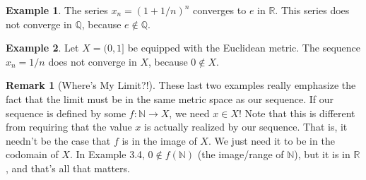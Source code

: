 \documentclass{article}
\newcommand{\N}{\mathbb{N}}
\newcommand{\R}{\mathbb{R}}
\newcommand{\Q}{\mathbb{Q}}
\theoremstyle{definition}
\newtheorem{example}{Example}[section]
\newtheorem{remark}{Remark}[section]
\begin{document}
\begin{example}
	The series $ x_n=(1+1/n)^n $ converges to $ e $ in $ \R $. This series does not converge in $ \Q $, because $ e\notin\Q $. 
\end{example}
\begin{example}
	Let $ X=(0,1] $ be equipped with the Euclidean metric. The sequence $ x_n=1/n $ does not converge in $ X $, because $ 0\notin X $. 
\end{example}
\begin{remark}[Where's My Limit?!]
	These last two examples really emphasize the fact that the limit must be in the same metric space as our sequence. If our sequence is defined by some $ f:\N\to X $, we need $ x\in X $! Note that this is different from requiring that the value $ x $ is actually realized by our sequence. That is, it needn't be the case that $ f $ is in the image of $ X $. We just need it to be in the codomain of $ X $. In Example 3.4, $ 0\notin f(\N) $ (the image/range of $ \N $), but it is in $ \R $, and that's all that matters. 
\end{remark}
\end{document}
